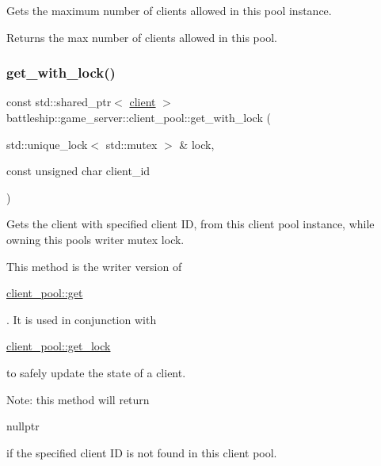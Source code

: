 Gets the maximum number of clients allowed in this pool instance. \begin{DoxyReturn}{Returns}
the max number of clients allowed in this pool. 
\end{DoxyReturn}
\mbox{\label{classbattleship_1_1game__server_1_1client__pool_ab8282d54f2e950f6625508a274dd96d9}} 
\subsubsection{\texorpdfstring{get\+\_\+with\+\_\+lock()}{get\_with\_lock()}}
{\footnotesize\ttfamily const std\+::shared\+\_\+ptr$<$ \hyperlink{classbattleship_1_1game__server_1_1client}{client} $>$ battleship\+::game\+\_\+server\+::client\+\_\+pool\+::get\+\_\+with\+\_\+lock (\begin{DoxyParamCaption}\item[{std\+::unique\+\_\+lock$<$ std\+::mutex $>$ \&}]{lock,  }\item[{const unsigned char}]{client\+\_\+id }\end{DoxyParamCaption})}

Gets the client with specified client ID, from this client pool instance, while owning this pool\textquotesingle{}s writer mutex lock.

This method is the writer version of
\begin{DoxyCode}
\hyperlink{classbattleship_1_1game__server_1_1client__pool_a39d1db920be949755ebe64b50d2bff96}{client\_pool::get} 
\end{DoxyCode}
 . It is used in conjunction with
\begin{DoxyCode}
\hyperlink{classbattleship_1_1game__server_1_1client__pool_a6feaf8b0a5c743aa411c2c82be229689}{client\_pool::get\_lock} 
\end{DoxyCode}
 to safely update the state of a client.

Note\+: this method will return
\begin{DoxyCode}
\textcolor{keyword}{nullptr} 
\end{DoxyCode}
 if the specified client ID is not found in this client pool.


